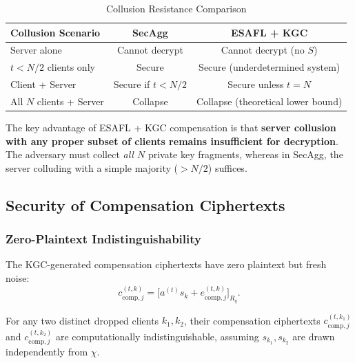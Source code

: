\begin{table}[htbp]
\centering
\caption{Collusion Resistance Comparison}
\label{tab:security-comparison}
\begin{tabular}{lcc}
\toprule
\textbf{Collusion Scenario} & \textbf{SecAgg} & \textbf{ESAFL + KGC} \\
\midrule
Server alone & Cannot decrypt & Cannot decrypt (no $S$) \\
$t < N/2$ clients only & Secure & Secure (underdetermined system) \\
Client + Server & Secure if $t < N/2$ & Secure unless $t = N$ \\
All $N$ clients + Server & Collapse & Collapse (theoretical lower bound) \\
\bottomrule
\end{tabular}
\end{table}

The key advantage of ESAFL + KGC compensation is that \textbf{server collusion with any proper subset of clients remains insufficient for decryption}. The adversary must collect \emph{all $N$} private key fragments, whereas in SecAgg, the server colluding with a simple majority ($> N/2$) suffices.

\subsection{Security of Compensation Ciphertexts}
\label{ssec:compensation-security}

\subsubsection{Zero-Plaintext Indistinguishability}

The KGC-generated compensation ciphertexts have zero plaintext but fresh noise:
\begin{equation}
    c_{\mathrm{comp},j}^{(t,k)} = \bigl[ a^{(t)} s_k + e_{\mathrm{comp},j}^{(t,k)} \bigr]_{R_q}.
\end{equation}

\begin{lemma}
\label{lem:comp-ind}
For any two distinct dropped clients $k_1, k_2$, their compensation ciphertexts $c_{\mathrm{comp},j}^{(t,k_1)}$ and $c_{\mathrm{comp},j}^{(t,k_2)}$ are computationally indistinguishable, assuming $s_{k_1}, s_{k_2}$ are drawn independently from $\chi$.
\end{lemma}

